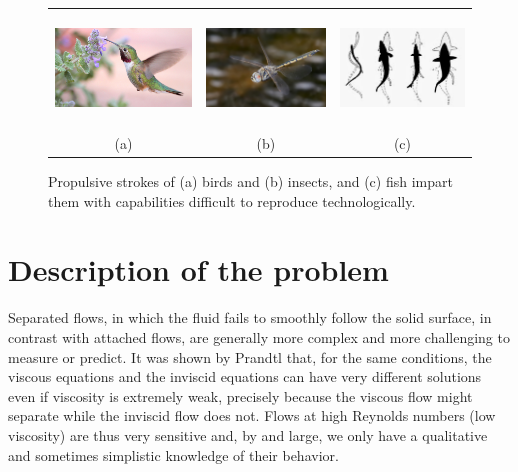 \begin{figure}
\begin{center}
\begin{tabular}[t]{ccc}
\includegraphics[height=3cm]{./Figures/intro/hummingbird.jpg} & 
\includegraphics[height=3cm]{./Figures/intro/insect.jpg} & 
\includegraphics[height=3cm]{./Figures/intro/fish.jpg} \\
(a) &
(b) &
(c)
\end{tabular}
\end{center}
\caption[Locomotion of birds, insects and fish using unsteady fluid dynamics]{Propulsive strokes of (a) birds and (b) insects, and (c) fish impart them with capabilities difficult to reproduce technologically.}
\label{fig:Insects}
\end{figure}

\section{Description of the problem}

Separated flows, in which the fluid fails to smoothly follow the solid surface, in contrast with attached flows, are generally more complex and more challenging to measure or predict.
It was shown by Prandtl that, for the same conditions, the viscous equations and the inviscid equations can have very different solutions even if viscosity is extremely weak, precisely because the viscous flow might separate while the inviscid flow does not.
Flows at high Reynolds numbers (low viscosity) are thus very sensitive and, by and large, we only have a qualitative and sometimes simplistic knowledge of their behavior.

